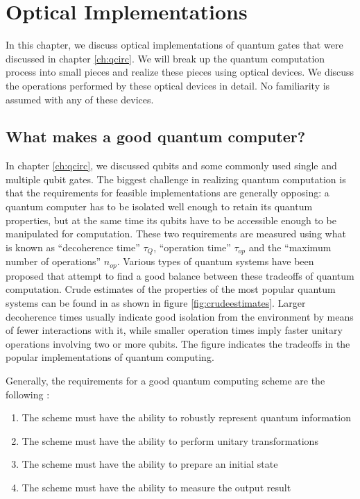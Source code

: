 \chapter{Optical Implementations\label{ch:optimp}}
In this chapter, we discuss optical implementations of quantum gates that were discussed in chapter \ref{ch:qcirc}. We will break up the quantum computation process into small pieces and realize these pieces using optical devices. We discuss the operations performed by these optical devices in detail. No familiarity is assumed with any of these devices.

\section{What makes a good quantum computer?}
In chapter \ref{ch:qcirc}, we discussed qubits and some commonly used single and multiple qubit gates. The biggest challenge in realizing quantum computation is that the requirements for feasible implementations are generally opposing: a quantum computer has to be isolated well enough to retain its quantum properties, but at the same time its qubits have to be accessible enough to be manipulated for computation. These two requirements are measured using what is known as ``decoherence time'' $\tau_Q$, ``operation time'' $\tau_{op}$ and the ``maximum number of operations'' $n_{op}$. Various types of quantum systems have been proposed that attempt to find a good balance between these tradeoffs of quantum computation. Crude estimates of the properties of the most popular quantum systems can be found in \cite{nielsen2000} as shown in figure \ref{fig:crudeestimates}. Larger decoherence times usually indicate good isolation from the environment by means of fewer interactions with it, while smaller operation times imply faster unitary operations involving two or more qubits. The figure indicates the tradeoffs in the popular implementations of quantum computing.


Generally, the requirements for a good quantum computing scheme are the following \cite{divincenzo}:
\begin{enumerate}\label{requirements}
\item The scheme must have the ability to robustly represent quantum information
\item The scheme must have the ability to perform unitary transformations
\item The scheme must have the ability to prepare an initial state
\item The scheme must have the ability to measure the output result
\end{enumerate}

